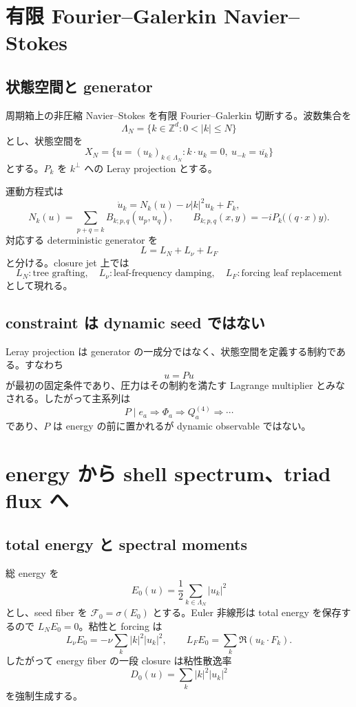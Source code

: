 \documentclass[11pt,a4paper,openany]{book}
\numberwithin{equation}{chapter}
\newcommand{\cF}{\mathcal F}
\begin{document}
\chapter{有限 Fourier--Galerkin Navier--Stokes}
\section{状態空間と generator}
周期箱上の非圧縮 Navier--Stokes を有限 Fourier--Galerkin 切断する。波数集合を
\[
\Lambda_N=\{k\in\mathbb Z^d:0<|k|\le N\}
\]
とし、状態空間を
\[
X_N
=\{u=(u_k)_{k\in\Lambda_N}:k\cdot u_k=0,\ u_{-k}=\overline{u_k}\}
\]
とする。$P_k$ を $k^\perp$ への Leray projection とする。

運動方程式は
\begin{equation}
\dot u_k=N_k(u)-\nu|k|^2u_k+F_k,
\end{equation}
\begin{equation}
N_k(u)=\sum_{p+q=k}B_{k;p,q}(u_p,u_q),
\qquad
B_{k;p,q}(x,y)=-iP_k\bigl((q\cdot x)y\bigr).
\end{equation}
対応する deterministic generator を
\[
L=L_N+L_\nu+L_F
\]
と分ける。closure jet 上では
\[
L_N:\text{tree grafting},
\quad
L_\nu:\text{leaf-frequency damping},
\quad
L_F:\text{forcing leaf replacement}
\]
として現れる。

\section{constraint は dynamic seed ではない}
Leray projection は generator の一成分ではなく、状態空間を定義する制約である。すなわち
\[
u=Pu
\]
が最初の固定条件であり、圧力はその制約を満たす Lagrange multiplier とみなされる。したがって主系列は
\[
P\mid e_a\Rightarrow \Phi_a\Rightarrow Q_a^{(4)}\Rightarrow\cdots
\]
であり、$P$ は energy の前に置かれるが dynamic observable ではない。

\chapter{energy から shell spectrum、triad flux へ}
\section{total energy と spectral moments}
総 energy を
\[
E_0(u)=\frac12\sum_{k\in\Lambda_N}|u_k|^2
\]
とし、seed fiber を $\cF_0=\sigma(E_0)$ とする。Euler 非線形は total energy を保存するので $L_NE_0=0$。粘性と forcing は
\[
L_\nu E_0=-\nu\sum_k|k|^2|u_k|^2,
\qquad
L_FE_0=\sum_k\Re(u_k\cdot F_k).
\]
したがって energy fiber の一段 closure は粘性散逸率
\[
D_0(u)=\sum_k|k|^2|u_k|^2
\]
を強制生成する。
\end{document}
